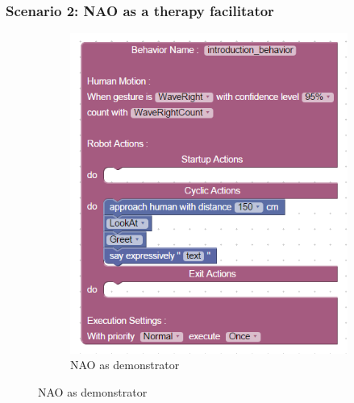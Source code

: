 \documentclass{llncs}
\begin{document}
\subsubsection{Scenario 2: NAO as a therapy facilitator}%
\begin{figure}
\centering
\begin{subfigure}[t]{0.5\textwidth}
\includegraphics[width=\textwidth]{../thesis/assets/scenario1.png}
\caption[NAO as demonstrator]{NAO as demonstrator}
\label{fig:scenario1_program}
\end{subfigure}


\end{figure}
\end{document}
